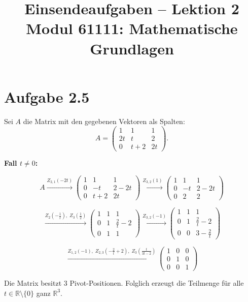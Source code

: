 \documentclass[a4paper,12pt]{article}
\title{Einsendeaufgaben -- Lektion 2\\[0.5em]
\large Modul 61111: Mathematische Grundlagen}
\author{}
\date{}
\begin{document}
\maketitle

\section*{Aufgabe 2.5}

Sei $A$ die Matrix mit den gegebenen Vektoren als Spalten:
\[
A = \begin{pmatrix}1 & 1 & 1 \\ 2t & t & 2 \\ 0 & t+2 & 2t\end{pmatrix}.
\]

\noindent\textbf{Fall $t \neq 0$:}

\[
A
\xrightarrow{Z_{2,1}(-2t)}
\begin{pmatrix}1 & 1 & 1 \\ 0 & -t & 2-2t \\ 0 & t+2 & 2t\end{pmatrix}
\xrightarrow{Z_{3,2}(1)}
\begin{pmatrix}1 & 1 & 1 \\ 0 & -t & 2-2t \\ 0 & 2 & 2\end{pmatrix}
\]

\[
\xrightarrow{Z_2\!\left(-\tfrac{1}{t}\right),\; Z_3\!\left(\tfrac{1}{2}\right)}
\begin{pmatrix}1 & 1 & 1 \\ 0 & 1 & \tfrac{2}{t}-2 \\ 0 & 1 & 1\end{pmatrix}
\xrightarrow{Z_{3,2}(-1)}
\begin{pmatrix}1 & 1 & 1 \\ 0 & 1 & \tfrac{2}{t}-2 \\ 0 & 0 & 3-\tfrac{2}{t}\end{pmatrix}
\]

\[
\xrightarrow{Z_{1,2}(-1),\; Z_{2,3}\!\left(-\tfrac{2}{t}+2\right),\; Z_3\!\left(\tfrac{t}{3t-2}\right)}
\begin{pmatrix}1 & 0 & 0 \\ 0 & 1 & 0 \\ 0 & 0 & 1\end{pmatrix}
\]

Die Matrix besitzt 3 Pivot-Positionen. Folglich erzeugt die Teilmenge für alle
$t \in \mathbb{R} \setminus \{0\}$ ganz $\mathbb{R}^3$.
\end{document}
